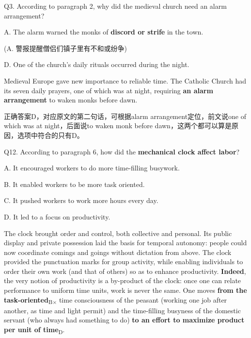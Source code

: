 \begin{blk}
    \begin{qst}
        Q3. According to paragraph 2, why did the medieval church need an alarm arrangement?
    \end{qst}

    \begin{chc}
        A. The alarm warned the monks of \textbf{discord or strife} in the town.

        (A. 警报提醒僧侣们镇子里有不和或纷争)

        D. One of the church’s daily rituals occurred during the night.
    \end{chc}

    \begin{psgq}
        Medieval Europe gave new importance to reliable time. The Catholic Church had its seven daily prayers, one of which was at night, requiring \textbf{an alarm arrangement} to waken monks before dawn.
    \end{psgq}

    \begin{nlz}
        正确答案D，对应原文的第二句话，可根据alarm arrangement定位，前文说one of which was at night，后面说to waken monk before dawn，这两个都可以算是原因，选项中符合的只有D。
    \end{nlz}

    \begin{qst}
        Q12. According to paragraph 6, how did the \textbf{mechanical clock affect labor}?
    \end{qst}

    \begin{chc}
        A. It encouraged workers to do more time-filling busywork.

        B. It enabled workers to be more task oriented.

        C. It pushed workers to work more hours every day.

        D. It led to a focus on productivity.
    \end{chc}

    \begin{psgq}
        The clock brought order and control, both collective and personal. Its public display and private possession laid the basis for temporal autonomy: people could now coordinate comings and goings without dictation from above. The clock provided the punctuation marks for group activity, while enabling individuals to order their own work (and that of others) so as to enhance productivity. \textbf{Indeed}, the very notion of productivity is a by-product of the clock: once one can relate performance to uniform time units, work is never the same. One moves \textbf{from the task-oriented}\textsubscript{B$\times$} time consciousness of the peasant (working one job after another, as time and light permit) and the time-filling busyness of the domestic servant (who always had something to do) \textbf{to an effort to maximize product per unit of time}\textsubscript{D}.
    \end{psgq}


\end{blk}
